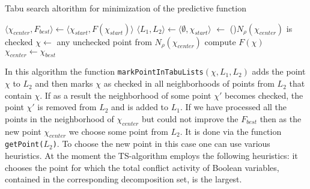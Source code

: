 \documentclass[runningheads,a4paper]{llncs}
\begin{document}
\begin{algorithm}
 \DontPrintSemicolon
 \caption{Tabu search altorithm for minimization of the predictive function}
	$\langle \chi_{center}, F_{best} \rangle \gets \langle \chi_{start}, F(\chi_{start}) \rangle$\;
	$\langle L_1, L_2 \rangle \gets \langle \emptyset, \chi_{start} \rangle$ 
	 {
		\bestValueUpdated $\gets$ \false\;
		\Repeat(){$N_{\rho}(\chi_{center})$ is checked}{
			$\chi \gets$ any unchecked point from $N_{\rho}(\chi_{center})$\;
			compute $F(\chi)$\;
			 
		}
		\lIf{\bestValueUpdated} {
			$\chi_{center} \gets \chi_{best}$\;
		}
	}
\;
\end{algorithm}

In this algorithm the function \texttt{markPointInTabuLists$\left(\chi,L_1,L_2\right)$} adds the point $\chi$ to $L_2$ and then marks $\chi$ as checked in all neighborhoods of points from $L_2$ that contain $\chi$. If as a result the neighborhood of some point $\chi'$ becomes checked, the point $\chi'$ is removed from $L_2$ and is added to $L_1$. If we have processed all the points in the neighborhood of $\chi_{center}$ but could not improve the $F_{best}$ then as the new point $\chi_{center}$ we choose some point from $L_2$. It is done via the function \texttt{getPoint($L_2$)}. To choose the new point in this case one can use various heuristics. At the moment the TS-algorithm employs the following heuristics: it chooses the point for which the total conflict activity of Boolean variables, contained in the corresponding decomposition set, is the largest.
\end{document}
